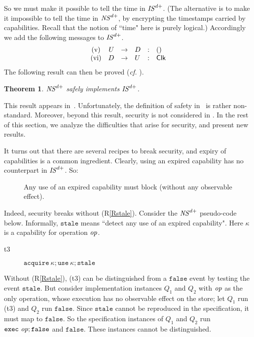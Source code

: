\documentclass[10pt]{article}
\makeatletter
\newtheorem{theorem}{Theorem}
\newcounter{Crules}
\newcommand{\clk}{\mathsf{Clk}}
\newcommand{\op}{{\it op}}
\newcommand{\R}{\addtocounter{Crules}{1}R\arabic{Crules}\gdef\@currentlabel{\arabic{Crules}}}
\makeatother
\begin{document}
So we must make it possible to tell the time in ${\it IS}^{d+}$. 
(The alternative is to make it impossible to tell the time in ${\it NS}^{d+}$, by encrypting the timestamps carried by capabilities. Recall that the notion of ``time" here is purely logical.) 
Accordingly we add the following messages to ${\it IS}^{d+}$.
\[
\left.
\begin{array}{crclcl}
({\rm v}) & U & \rightarrow  & D & : & () \\
 ({\rm vi}) & D & \rightarrow  & U & : & \clk 
\end{array}
\right.
\]
The following result can then be proved (\emph{cf.} \cite{ForteChaudhuriA06}). \begin{theorem}
${\it NS}^{d+}$ safely implements ${\it IS}^{d+}$.
\end{theorem}
\noindent
This result appears in~\cite{ForteChaudhuriA06}. Unfortunately, the definition of safety in~\cite{ForteChaudhuriA06} is rather non-standard. Moreover, beyond this result, security is not considered in \cite{ForteChaudhuriA06}. In the rest of this section, we analyze the difficulties that arise for security, and present new results. 

It turns out that there are several recipes to break security, and expiry of capabilities is a common ingredient. Clearly, using an expired capability has no counterpart in ${\it IS}^{d+}$. So:
\begin{description}
\item[\R]\label{Rstale} Any use of an expired capability must block (without any observable effect). 
\end{description}
Indeed, security breaks without (R\ref{Rstale}). Consider the ${\it NS}^{d+}$ pseudo-code below. Informally, $\mathtt{stale}$ means ``detect any use of an expired capability". Here $\kappa$ is a capability for operation $\op$.
\begin{description}
\item[t3] $\mathtt{acquire}~\kappa; \mathtt{use}~\kappa; \mathtt{stale}$
\end{description}
\noindent
Without (R\ref{Rstale}), (t3) can be distinguished from a $\mathtt{false}$ event by testing the event $\mathtt{stale}$. But consider implementation instances $Q_1$ and $Q_2$ with $\op$ as the only operation, whose execution has no observable effect on the store; let $Q_1$ run (t3) and $Q_2$ run $\mathtt{false}$. Since $\mathtt{stale}$ cannot be reproduced in the specification, it must map to $\mathtt{false}$. So the specification instances of $Q_1$ and $Q_2$ run $\mathtt{exec}~\op; \mathtt{false}$ and $\mathtt{false}$. These instances cannot be distinguished. 
\end{document}
